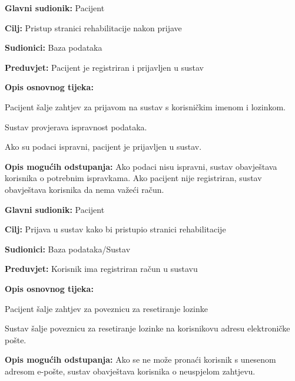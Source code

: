 \noindent {}
\begin{packed_item}
	
	\item \textbf{Glavni sudionik: }Pacijent
	\item  \textbf{Cilj:} Pristup stranici rehabilitacije nakon prijave
	\item  \textbf{Sudionici:} Baza podataka
	\item  \textbf{Preduvjet:} Pacijent je registriran i prijavljen u sustav
	\item  \textbf{Opis osnovnog tijeka:}
	
	\item[] \begin{packed_enum}
		
		\item Pacijent šalje zahtjev za prijavom na sustav s korisničkim imenom i lozinkom.
		\item Sustav provjerava ispravnost podataka.
		\item Ako su podaci ispravni, pacijent je prijavljen u sustav.
		
	\end{packed_enum}
	
	\item  \textbf{Opis mogućih odstupanja:} Ako podaci nisu ispravni, sustav obavještava korisnika o potrebnim ispravkama. Ako pacijent nije registriran, sustav obavještava korisnika da nema važeći račun. 
	
	
\end{packed_item}

\noindent {}
\begin{packed_item}
	
	\item \textbf{Glavni sudionik: }Pacijent
	\item  \textbf{Cilj:} Prijava u sustav kako bi pristupio stranici rehabilitacije
	\item  \textbf{Sudionici:} Baza podataka/Sustav
	\item  \textbf{Preduvjet:} Korisnik ima registriran račun u sustavu
	\item  \textbf{Opis osnovnog tijeka:}
	
	\item[] \begin{packed_enum}
		
		\item Pacijent šalje zahtjev za poveznicu za resetiranje lozinke
		\item Sustav šalje poveznicu za resetiranje lozinke na korisnikovu adresu elektroničke pošte.
		
	\end{packed_enum}
	
	\item  \textbf{Opis mogućih odstupanja:} Ako se ne može pronaći korisnik s unesenom adresom e-pošte, sustav obavještava korisnika o neuspjelom zahtjevu. 
	
	
\end{packed_item}

